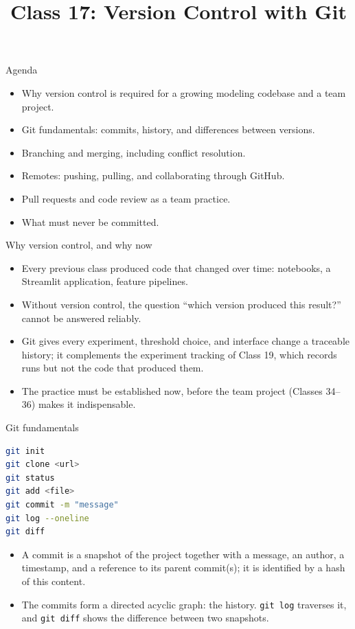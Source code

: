 
\usepackage{amssymb}

\title{Class 17: Version Control with Git}
\author{\coursename}
\date{}



\frame{\titlepage \coursefooter}

\begin{frame}{Agenda}
\begin{itemize}
\item Why version control is required for a growing modeling codebase and a team project.
\item Git fundamentals: commits, history, and differences between versions.
\item Branching and merging, including conflict resolution.
\item Remotes: pushing, pulling, and collaborating through GitHub.
\item Pull requests and code review as a team practice.
\item What must never be committed.
\end{itemize}
\coursefooter
\end{frame}

\begin{frame}{Why version control, and why now}
\begin{itemize}
\item Every previous class produced code that changed over time: notebooks, a Streamlit application, feature pipelines.
\item Without version control, the question ``which version produced this result?'' cannot be answered reliably.
\item Git gives every experiment, threshold choice, and interface change a traceable history; it complements the experiment tracking of Class 19, which records runs but not the code that produced them.
\item The practice must be established now, before the team project (Classes 34--36) makes it indispensable.
\end{itemize}
\coursefooter
\end{frame}

\begin{frame}[fragile]{Git fundamentals}
\begin{lstlisting}[style=coursepython,language=bash]
git init
git clone <url>
git status
git add <file>
git commit -m "message"
git log --oneline
git diff
\end{lstlisting}
\begin{itemize}
\item A commit is a snapshot of the project together with a message, an author, a timestamp, and a reference to its parent commit(s); it is identified by a hash of this content.
\item The commits form a directed acyclic graph: the history. \texttt{git log} traverses it, and \texttt{git diff} shows the difference between two snapshots.
\end{itemize}
\coursefooter
\end{frame}

